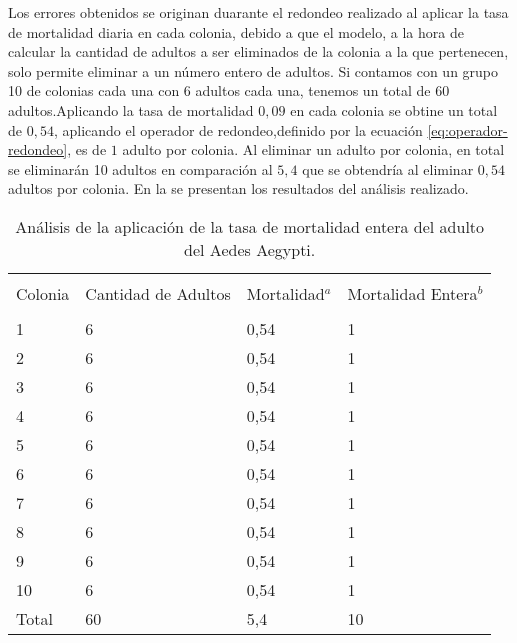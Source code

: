 Los errores obtenidos se originan duarante el redondeo realizado al aplicar la tasa de
mortalidad diaria en cada colonia, debido a que el modelo, a la hora de calcular la cantidad de
adultos a ser eliminados de la colonia a la que pertenecen, solo permite eliminar a un número
entero de adultos. Si contamos con un grupo 10 de colonias cada una con 6 adultos cada una,
tenemos un total de 60 adultos.Aplicando la tasa de mortalidad $0,09$ en cada colonia se obtine un
total de $0,54$, aplicando el operador de redondeo,definido por la ecuación
\eqref{eq:operador-redondeo}, es de $1$ adulto por colonia. Al eliminar un adulto por colonia, en
total se eliminarán 10 adultos en comparación al $5,4$ que se obtendría al eliminar $0,54$ adultos
por colonia. En la  se presentan los resultados del
análisis realizado.

\begin{table}
    \begin{minipage}{\textwidth}
        \caption{ \label{tab:mortalidad-adulto-error} Análisis de la aplicación de la tasa de
        mortalidad entera del adulto del Aedes Aegypti.}

        \begin{tabular}{p{4cm} p{4cm} p{3cm} l }
                    \hline \\
                    Colonia & Cantidad de Adultos & Mortalidad$^{a}$ & Mortalidad Entera$^{b}$\\
                    \hline
                    \hline \\
                    1       & 6  & 0,54 & 1\\
                    2       & 6  & 0,54 & 1\\
                    3       & 6  & 0,54 & 1\\
                    4       & 6  & 0,54 & 1\\
                    5       & 6  & 0,54 & 1\\
                    6       & 6  & 0,54 & 1\\
                    7       & 6  & 0,54 & 1\\
                    8       & 6  & 0,54 & 1\\
                    9       & 6  & 0,54 & 1\\
                    10      & 6  & 0,54 & 1\\
                    Total   & 60 & 5,4  & 10\\
        \end{tabular}
    \end{minipage}
\end{table}
